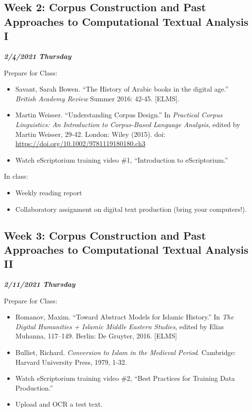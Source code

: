\documentclass[
]{book}
\providecommand{\tightlist}{%
  \setlength{\itemsep}{0pt}\setlength{\parskip}{0pt}}
\begin{document}
\hypertarget{week-2-corpus-construction-and-past-approaches-to-computational-textual-analysis-i}{%
\subsection{Week 2: Corpus Construction and Past Approaches to Computational Textual Analysis I}\label{week-2-corpus-construction-and-past-approaches-to-computational-textual-analysis-i}}

\textbf{\emph{2/4/2021 Thursday}}

Prepare for Class:

\begin{itemize}
\tightlist
\item
  Savant, Sarah Bowen. ``The History of Arabic books in the digital age.'' \emph{British Academy Review} Summer 2016: 42-45. {[}ELMS{]}.
\item
  Martin Weisser. ``Understanding Corpus Design.'' In \emph{Practical Corpus Linguistics: An Introduction to Corpus‐Based Language Analysis}, edited by Martin Weisser, 29-42. London: Wiley (2015). doi: \url{https://doi.org/10.1002/9781119180180.ch3}
\item
  Watch eScriptorium training video \#1, ``Introduction to eScriptorium.''
\end{itemize}

In class:

\begin{itemize}
\tightlist
\item
  Weekly reading report
\item
  Collaboratory assignment on digital text production (bring your computers!).
\end{itemize}

\hypertarget{week-3-corpus-construction-and-past-approaches-to-computational-textual-analysis-ii}{%
\subsection{Week 3: Corpus Construction and Past Approaches to Computational Textual Analysis II}\label{week-3-corpus-construction-and-past-approaches-to-computational-textual-analysis-ii}}

\textbf{\emph{2/11/2021 Thursday}}

Prepare for Class:

\begin{itemize}
\tightlist
\item
  Romanov, Maxim. ``Toward Abstract Models for Islamic History.'' In \emph{The Digital Humanities + Islamic Middle Eastern Studies}, edited by Elias Muhanna, 117--149. Berlin: De Gruyter, 2016. {[}ELMS{]}
\item
  Bulliet, Richard. \emph{Conversion to Islam in the Medieval Period}. Cambridge: Harvard University Press, 1979, 1-32.
\item
  Watch eScriptorium training video \#2, ``Best Practices for Training Data Production.''
\item
  Upload and OCR a test text.
\end{itemize}
\end{document}
